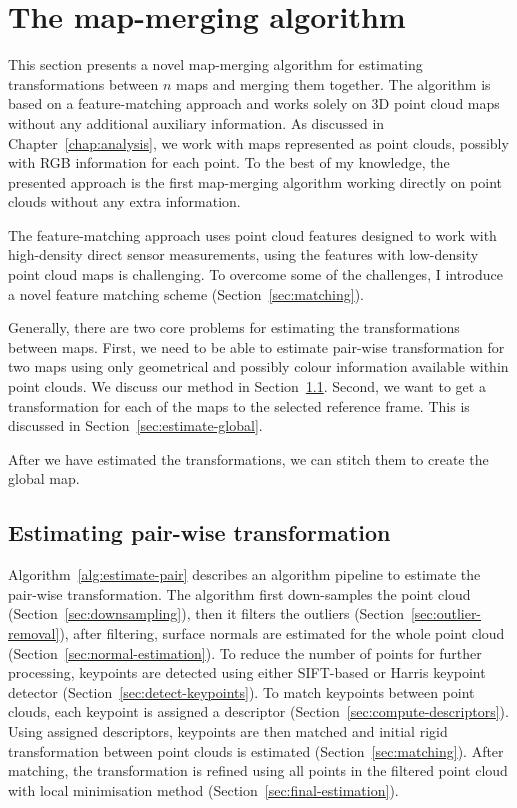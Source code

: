 \chapter{The map-merging algorithm}
\label{chap:mergingalgorithm}

This section presents a novel map-merging algorithm for estimating transformations between $n$ maps and merging them together. The algorithm is based on a feature-matching approach and works solely on \gls{3D} point cloud maps without any additional auxiliary information. As discussed in Chapter~\ref{chap:analysis}, we work with maps represented as point clouds, possibly with \gls{RGB} information for each point. To the best of my knowledge, the presented approach is the first map-merging algorithm working directly on point clouds without any extra information.

The feature-matching approach uses point cloud features designed to work with high-density direct sensor measurements, using the features with low-density point cloud maps is challenging. To overcome some of the challenges, I introduce a novel feature matching scheme (Section~\ref{sec:matching}).

Generally, there are two core problems for estimating the transformations between maps. First, we need to be able to estimate pair-wise transformation for two maps using only geometrical and possibly colour information available within point clouds. We discuss our method in Section~\ref{sec:estimate-pair-wise}. Second, we want to get a transformation for each of the maps to the selected reference frame. This is discussed in Section~\ref{sec:estimate-global}.

After we have estimated the transformations, we can stitch them to create the global map.

\section{Estimating pair-wise transformation}
\label{sec:estimate-pair-wise}

Algorithm~\ref{alg:estimate-pair} describes an algorithm pipeline to estimate the pair-wise transformation. The algorithm first down-samples the point cloud (Section~\ref{sec:downsampling}), then it filters the outliers (Section~\ref{sec:outlier-removal}), after filtering, surface normals are estimated for the whole point cloud (Section~\ref{sec:normal-estimation}). To reduce the number of points for further processing, keypoints are detected using either \gls{SIFT}-based or Harris keypoint detector (Section~\ref{sec:detect-keypoints}). To match keypoints between point clouds, each keypoint is assigned a descriptor (Section~\ref{sec:compute-descriptors}). Using assigned descriptors, keypoints are then matched and initial rigid transformation between point clouds is estimated (Section~\ref{sec:matching}). After matching, the transformation is refined using all points in the filtered point cloud with local minimisation method (Section~\ref{sec:final-estimation}).

